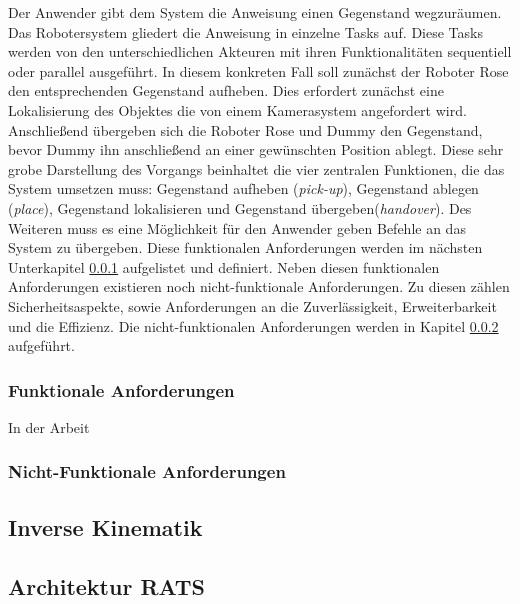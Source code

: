  Der Anwender gibt dem System die Anweisung einen Gegenstand wegzuräumen. Das Robotersystem gliedert die Anweisung in einzelne Tasks auf. Diese Tasks werden von den unterschiedlichen Akteuren mit ihren Funktionalitäten sequentiell oder parallel ausgeführt. In diesem konkreten Fall soll zunächst der Roboter Rose den entsprechenden Gegenstand aufheben. Dies erfordert zunächst eine Lokalisierung des Objektes die von einem Kamerasystem angefordert wird. Anschließend übergeben sich die Roboter Rose und Dummy den Gegenstand, bevor Dummy ihn anschließend an einer gewünschten Position ablegt. Diese sehr grobe Darstellung des Vorgangs beinhaltet die vier zentralen Funktionen, die das System umsetzen muss: Gegenstand aufheben (\textit{pick-up}), Gegenstand ablegen (\textit{place}), Gegenstand lokalisieren und Gegenstand übergeben(\textit{handover}). Des Weiteren muss es eine Möglichkeit für den Anwender geben Befehle an das System zu übergeben. Diese funktionalen Anforderungen werden im nächsten Unterkapitel \ref{sec:dev-funk} aufgelistet und definiert. Neben diesen funktionalen Anforderungen existieren noch nicht-funktionale Anforderungen. Zu diesen zählen Sicherheitsaspekte, sowie Anforderungen an die Zuverlässigkeit, Erweiterbarkeit und die Effizienz. Die nicht-funktionalen Anforderungen werden in Kapitel \ref{sec:dev-nichtfunk} aufgeführt.
 
\subsubsection{Funktionale Anforderungen}
\label{sec:dev-funk}
In der Arbeit \cite{lundh2006plan} 

\subsubsection{Nicht-Funktionale Anforderungen}
\label{sec:dev-nichtfunk}

\subsection{Inverse Kinematik}
\subsection{Architektur RATS}
